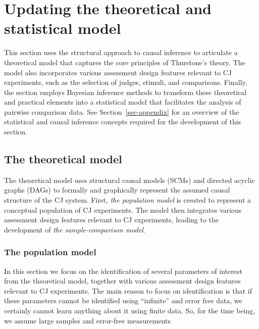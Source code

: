 \documentclass[
  authoryear,
  review,
  1p]{elsarticle}
\begin{document}
\section{Updating the theoretical and statistical
model}\label{sec-theory}

This section uses the structural approach to causal inference
\citep{Pearl_2009, Pearl_et_al_2016} to articulate a theoretical model
that captures the core principles of Thurstone's theory. The model also
incorporates various assessment design features relevant to CJ
experiments, such as the selection of judges, stimuli, and comparisons.
Finally, the section employs Bayesian inference methods to transform
these theoretical and practical elements into a statistical model that
facilitates the analysis of pairwise comparison data. See
Section~\ref{sec-appendix} for an overview of the statistical and causal
inference concepts required for the development of this section.

\subsection{The theoretical model}\label{sec-theory-theoretical}

The theoretical model uses structural causal models (SCMs) and directed
acyclic graphs (DAGs)
\citep{Pearl_2009, Pearl_et_al_2016, Gross_et_al_2018, Neal_2020} to
formally and graphically represent the assumed causal structure of the
CJ system. First, \emph{the population model} is created to represent a
conceptual population of CJ experiments. The model then integrates
various assessment design features relevant to CJ experiments, leading
to the development of \emph{the sample-comparison model}.

\subsubsection{The population model}\label{sec-theory-theoretical_P}

In this section we focus on the identification of several parameters of
interest from the theoretical model, together with various assessment
design features relevant to CJ experiments. The main reason to focus on
identification is that if these parameters cannot be identified using
``infinite'' and error free data, we certainly cannot learn anything
about it using finite data. So, for the time being, we assume large
samples and error-free measurements \citep[pp.~5]{Schuessler_et_al_2023}
\end{document}
